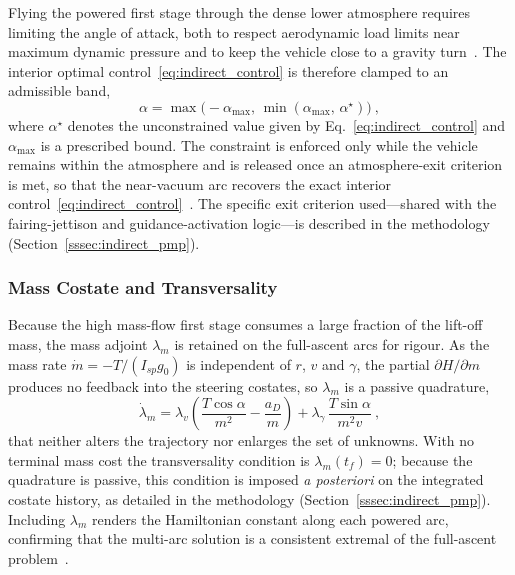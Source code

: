 Flying the powered first stage through the dense lower atmosphere requires limiting the angle of attack, both to respect aerodynamic load limits near maximum dynamic pressure and to keep the vehicle close to a gravity turn~\cite{Cremaschi2013TrajectoryOptimization}. The interior optimal control~\eqref{eq:indirect_control} is therefore clamped to an admissible band,
\begin{equation}
\alpha = \max\!\bigl(-\alpha_{\max},\,\min(\alpha_{\max},\,\alpha^{\star})\bigr) \ ,
\label{eq:fa_alpha_clamp}
\end{equation}
where $\alpha^{\star}$ denotes the unconstrained value given by Eq.~\eqref{eq:indirect_control} and $\alpha_{\max}$ is a prescribed bound. The constraint is enforced only while the vehicle remains within the atmosphere and is released once an atmosphere-exit criterion is met, so that the near-vacuum arc recovers the exact interior control~\eqref{eq:indirect_control}~\cite{gath2001optimization}. The specific exit criterion used---shared with the fairing-jettison and guidance-activation logic---is described in the methodology (Section~\ref{sssec:indirect_pmp}).


\subsubsection{Mass Costate and Transversality}
\label{sssec:fa_masscostate}

Because the high mass-flow first stage consumes a large fraction of the lift-off mass, the mass adjoint $\lambda_m$ is retained on the full-ascent arcs for rigour. As the mass rate $\dot{m} = -T/(I_{sp}g_0)$ is independent of $r$, $v$ and $\gamma$, the partial $\partial H/\partial m$ produces no feedback into the steering costates, so $\lambda_m$ is a passive quadrature,
\begin{equation}
\dot{\lambda}_m = \lambda_v\!\left(\frac{T\cos\alpha}{m^{2}} - \frac{a_D}{m}\right)
+ \lambda_\gamma\,\frac{T\sin\alpha}{m^{2}v} \ ,
\label{eq:fa_masscostate}
\end{equation}
that neither alters the trajectory nor enlarges the set of unknowns. With no terminal mass cost the transversality condition is $\lambda_m(t_f)=0$; because the quadrature is passive, this condition is imposed \emph{a posteriori} on the integrated costate history, as detailed in the methodology (Section~\ref{sssec:indirect_pmp}). Including $\lambda_m$ renders the Hamiltonian constant along each powered arc, confirming that the multi-arc solution is a consistent extremal of the full-ascent problem~\cite{pontani2013ascent,pontani2019ascent}.

